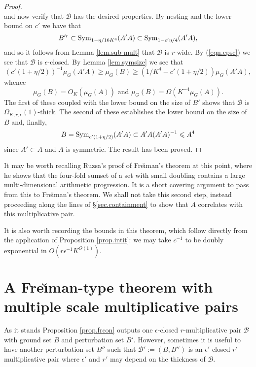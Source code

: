 \documentclass[12pt]{amsart}
\numberwithin{equation}{section}
\theoremstyle{plain}
\theoremstyle{definition}
\renewcommand{\leq}{\leqslant}
\renewcommand{\geq}{\geqslant}
\providecommand{\Sym}{\mathop{\rm Sym}\nolimits}
\begin{document}
\begin{proof}
\begin{equation*}
\end{equation*}
and now verify that $\mathcal{B}$ has the desired properties.  By nesting and the lower bound on $c'$ we have that
\begin{equation*}
B'^r\subset \Sym_{1-\eta/16K^4}(A'A)\subset \Sym_{1-c'\eta/4}(A'A),
\end{equation*}
and so it follows from Lemma \ref{lem.sub-mult} that $\mathcal{B}$ is $r$-wide.  By (\ref{eqn.epsc}) we see that $\mathcal{B}$ is $\epsilon$-closed.  By Lemma \ref{lem.symsize} we see that
\begin{equation*}
(c'(1+\eta/2))^{-1}\mu_G(A'A) \geq \mu_G(B) \geq (1/K^4 - c'(1+\eta/2))\mu_G(A'A),
\end{equation*}
whence
\begin{equation*}
\mu_G(B) = O_K(\mu_G(A)) \textrm{ and } \mu_G(B) = \Omega(K^{-4}\mu_G(A)).
\end{equation*}
The first of these coupled with the lower bound on the size of $B'$ shows that $\mathcal{B}$ is $\Omega_{K,r,\epsilon}(1)$-thick.  The second of these establishes the lower bound on the size of $B$ and, finally,
\begin{equation*}
B=\Sym_{c'(1+\eta/2)}(A'A) \subset A'A(A'A)^{-1} \leq A^4
\end{equation*}
since $A' \subset A$ and $A$ is symmetric.  The result has been proved.
\end{proof}
It may be worth recalling Ruzsa's proof of Fre{\u\i}man's theorem \cite{IZRF} at this  point, where he shows that the four-fold sumset of a set with small doubling contains a large multi-dimensional arithmetic progression.  It is a short covering argument to pass from this to Fre{\u\i}man's theorem.  We shall not take this second step, instead proceeding along the lines of \S\ref{sec.containment} to show that $A$ correlates with this multiplicative pair.

It is also worth recording the bounds in this theorem, which follow directly from the application of Proposition \ref{prop.intit}: we may take $c^{-1}$ to be doubly exponential in $O(r\epsilon^{-1}K^{O(1)})$.

\section{A Fre{\u\i}man-type theorem with multiple scale multiplicative pairs}\label{sec.freimult}

As it stands Proposition \ref{prop.frcon} outputs one $\epsilon$-closed $r$-multiplicative pair $\mathcal{B}$ with ground set $B$ and perturbation set $B'$.  However, sometimes it is useful to have another perturbation set $B''$ such that $\mathcal{B}':=(B,B'')$ is an $\epsilon'$-closed $r'$-multiplicative pair where $\epsilon'$ and $r'$ may depend on the thickness of $\mathcal{B}$.  
\end{document}
